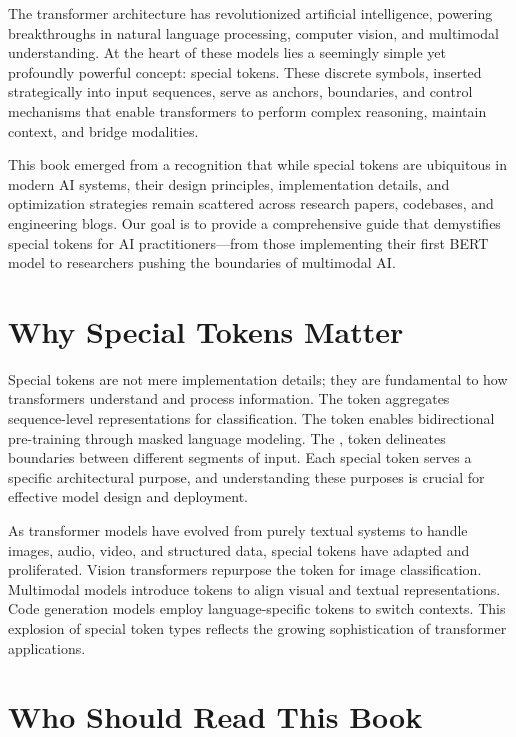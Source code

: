 The transformer architecture has revolutionized artificial intelligence, powering breakthroughs in natural language processing, computer vision, and multimodal understanding. At the heart of these models lies a seemingly simple yet profoundly powerful concept: special tokens. These discrete symbols, inserted strategically into input sequences, serve as anchors, boundaries, and control mechanisms that enable transformers to perform complex reasoning, maintain context, and bridge modalities.

This book emerged from a recognition that while special tokens are ubiquitous in modern AI systems, their design principles, implementation details, and optimization strategies remain scattered across research papers, codebases, and engineering blogs. Our goal is to provide a comprehensive guide that demystifies special tokens for AI practitioners---from those implementing their first BERT model to researchers pushing the boundaries of multimodal AI.

\section*{Why Special Tokens Matter}

Special tokens are not mere implementation details; they are fundamental to how transformers understand and process information. The \cls{} token aggregates sequence-level representations for classification. The \mask{} token enables bidirectional pre-training through masked language modeling. The \sep{} token delineates boundaries between different segments of input. Each special token serves a specific architectural purpose, and understanding these purposes is crucial for effective model design and deployment.

As transformer models have evolved from purely textual systems to handle images, audio, video, and structured data, special tokens have adapted and proliferated. Vision transformers repurpose the \cls{} token for image classification. Multimodal models introduce \img{} tokens to align visual and textual representations. Code generation models employ language-specific tokens to switch contexts. This explosion of special token types reflects the growing sophistication of transformer applications.

\section*{Who Should Read This Book}


